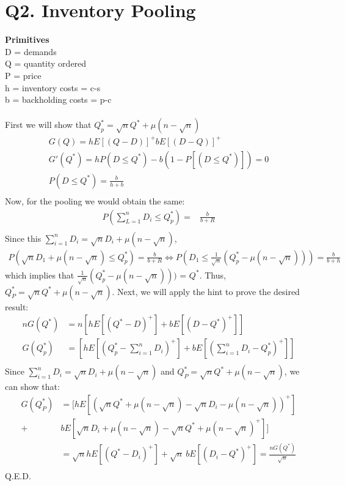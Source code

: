 \documentclass[11pt, english]{article}
\begin{document}
\section*{Q2. Inventory Pooling}
\textbf{Primitives}\\ D = demands \\ Q = quantity ordered \\ P = price \\ h =
inventory costs =  c-s \\ b = backholding costs = p-c \\ \\ First we will show that $Q_p^* = \sqrt{n}Q^* + \mu(n- \sqrt{n})$%
\begin{align*} 
G(Q) = hE[(Q-D)]^+bE[(D-Q)]^+ \\ G'(Q^*)= hP(D \leq Q^*) - b(1-P[(D\leq Q^*)]) =
0 \\ P(D \leq Q^*) = \frac{b}{h+b} \\ 
\end{align*}
Now, for the pooling we would obtain the same:
\begin{align*} 
P (\sum_{L= 1}^n D_i \leq Q_p^*) = &  \frac{b}{b+R} \\
\end{align*}
Since  this $\sum_{i = 1}^nD_i = \sqrt{n}D_i+\mu(n-\sqrt{n})$, 
\begin{align*}	
P(\sqrt{n}D_1 + \mu(n - \sqrt{n})\leq Q_p^*) = \frac{b}{b+R}  \Longleftrightarrow P(D_1 \leq
\frac{1}{\sqrt{n}}(Q_p^*- \mu(n-\sqrt{n})))= \frac{b}{b + h} \end{align*} 
which implies that $\frac{1}{\sqrt{n}}(Q_p^*- \mu(n-\sqrt{n})))$ = $Q^*$. Thus, $Q^*_P = \sqrt{n}Q^*+\mu(n-\sqrt{n})$.  Next, we will apply the hint to prove the desired result:
\begin{align*} nG(Q^*) &=
n[hE[(Q^*-D)^+]+bE[(D-Q^*)^+]]\\ G(Q^*_p) & =
[hE[(Q^*_p-\sum_{i=1}^nD_i)^+]+bE[(\sum_{i=1}^nD_i-Q^*_p)^+]]\\ 
\end{align*} 
Since $\sum_{i = 1}^nD_i = \sqrt{n}D_i+\mu(n-\sqrt{n})$ and $Q^*_P = \sqrt{n}Q^*+\mu(n-\sqrt{n})$, we can show that:\\
\begin{align*} 
G(Q^*_P) & =  [hE[(\sqrt{n}Q^*+\mu(n-\sqrt{n})-\sqrt{n}D_i-\mu(n-\sqrt{n}))^+] \\
+& b E[\sqrt{n}D_i+\mu(n-\sqrt{n})-\sqrt{n}Q^*+\mu(n-\sqrt{n})^+]]\\
& = \sqrt{n}hE[(Q^*-D_i)^+] + \sqrt{n} \ b E[(D_i-Q^*)^+] = \frac{nG(Q^*)}{\sqrt{n}}\\ 
\end{align*} 
Q.E.D.\\
\end{document}
